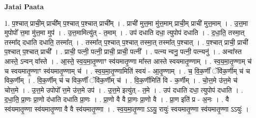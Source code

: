 \documentclass[17pt]{extarticle}
\begin{document}
\textbf{Jatai Paata} \newline

1. प॒श्चात् प्राची॒म् प्राची᳚म् प॒श्चात् प॒श्चात् प्राची᳚म् । . प्राची॑ मुत्त॒मा मु॑त्त॒माम् प्राची॒म् प्राची॑ मुत्त॒माम् । . उ॒त्त॒मा मुपोपो᳚ त्त॒मा मु॑त्त॒मा मुप॑ । . उ॒त्त॒मामित्यु॑त् - त॒माम् । . उप॑ दधाति दधा॒ त्युपोप॑ दधाति । . द॒धा॒ति॒ तस्मा॒त् तस्मा᳚द् दधाति दधाति॒ तस्मा᳚त् । . तस्मा᳚त् प॒श्चात् प॒श्चात् तस्मा॒त् तस्मा᳚त् प॒श्चात् । . प॒श्चात् प्राची॒ प्राची॑ प॒श्चात् प॒श्चात् प्राची᳚ । . प्राची॒ पत्नी॒ पत्नी॒ प्राची॒ प्राची॒ पत्नी᳚ । . पत्न्य न्वनु॒ पत्नी॒ पत्न्यनु॑ । . अन्वा᳚स्त आस्ते॒ ऽन्वन् वा᳚स्ते । . आ॒स्ते॒ स्व॒य॒मा॒तृ॒ण्णाꣳ स्व॑यमातृ॒ण्णा मा᳚स्त आस्ते स्वयमातृ॒ण्णाम् । . स्व॒य॒मा॒तृ॒ण्णाम् च॑ च स्वयमातृ॒ण्णाꣳ स्व॑यमातृ॒ण्णाम् च॑ । . स्व॒य॒मा॒तृ॒ण्णामिति॑ स्वयं - आ॒तृ॒ण्णाम् । . च॒ वि॒क॒र्णीं ॅवि॑क॒र्णीम् च॑ च विक॒र्णीम् । . वि॒क॒र्णीम् च॑ च विक॒र्णीं ॅवि॑क॒र्णीम् च॑ । . वि॒क॒र्णीमिति॑ वि - क॒र्णीम् । . चो॒त्त॒मे उ॑त्त॒मे च॑ चोत्त॒मे । . उ॒त्त॒मे उपोपो᳚ त्त॒मे उ॑त्त॒मे उप॑ । . उ॒त्त॒मे इत्यु॑त् - त॒मे । . उप॑ दधाति दधा॒ त्युपोप॑ दधाति । . द॒धा॒ति॒ प्रा॒णः प्रा॒णो द॑धाति दधाति प्रा॒णः । . प्रा॒णो वै वै प्रा॒णः प्रा॒णो वै । . प्रा॒ण इति॑ प्र - अ॒नः । . वै स्व॑यमातृ॒ण्णा स्व॑यमातृ॒ण्णा वै वै स्व॑यमातृ॒ण्णा । . स्व॒य॒मा॒तृ॒ण्णा ऽऽयु॒ रायुः॑ स्वयमातृ॒ण्णा स्व॑यमातृ॒ण्णा ऽऽयुः॑ । \newline
\end{document}

